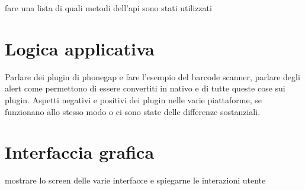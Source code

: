 fare una lista di quali metodi dell'api sono stati utilizzati

\section{Logica applicativa}

Parlare dei plugin di phonegap e fare l'esempio del barcode scanner, parlare degli alert come permettono di essere convertiti in nativo e di tutte queste cose sui plugin. Aspetti negativi e positivi dei plugin nelle varie piattaforme, se funzionano allo stesso modo o ci sono state delle differenze sostanziali.

\section{Interfaccia grafica}

mostrare lo screen delle varie interfacce e spiegarne le interazioni utente
